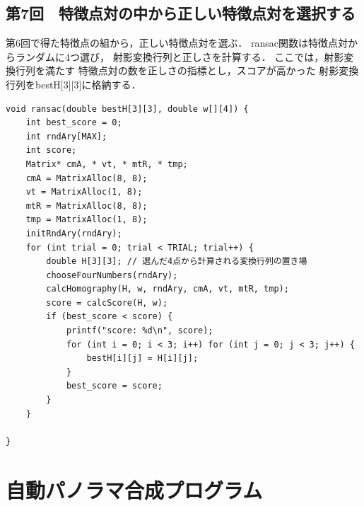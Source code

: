 \documentclass[11pt]{jarticle}
\begin{document}
\subsection{第7回　特徴点対の中から正しい特徴点対を選択する}

第6回で得た特徴点の組から，正しい特徴点対を選ぶ．
ransac関数は特徴点対からランダムに4つ選び，
射影変換行列と正しさを計算する．
ここでは，射影変換行列を満たす
特徴点対の数を正しさの指標とし，スコアが高かった
射影変換行列をbestH[3][3]に格納する．

\begin{lstlisting}
void ransac(double bestH[3][3], double w[][4]) {
    int best_score = 0;
    int rndAry[MAX];
    int score;
    Matrix* cmA, * vt, * mtR, * tmp;
    cmA = MatrixAlloc(8, 8);
    vt = MatrixAlloc(1, 8);
    mtR = MatrixAlloc(8, 8);
    tmp = MatrixAlloc(1, 8);
    initRndAry(rndAry);
    for (int trial = 0; trial < TRIAL; trial++) {
        double H[3][3]; // 選んだ4点から計算される変換行列の置き場
        chooseFourNumbers(rndAry);
        calcHomography(H, w, rndAry, cmA, vt, mtR, tmp);
        score = calcScore(H, w);
        if (best_score < score) {
            printf("score: %d\n", score);
            for (int i = 0; i < 3; i++) for (int j = 0; j < 3; j++) {
                bestH[i][j] = H[i][j];
            }
            best_score = score;
        }
    }

}
\end{lstlisting}

\section{自動パノラマ合成プログラム}
\end{document}
